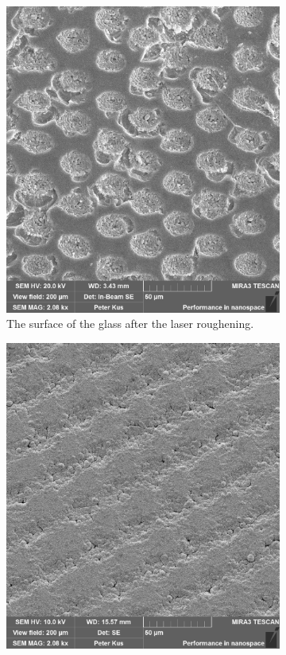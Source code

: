 \begin{figure}[H]
\begin{subfigure}{.45\textwidth}
	\centering
	\includegraphics[width=\linewidth]{img/200um_glass.pdf}
	\caption{The surface of the glass after the laser roughening.}
	\label{fig:glass}
\end{subfigure}\hfill%
\begin{subfigure}{.465\textwidth}
	\centering
	\includegraphics[width=\linewidth]{img/200um_copper.pdf}

\end{subfigure}
\end{figure}
